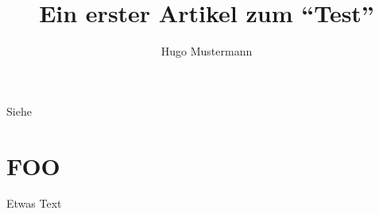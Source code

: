 \documentclass{dtk2}
\author{Hugo Mustermann}
\begin{document}
\title{Ein erster Artikel zum "`Test"'}

\maketitle
\nocite{*}
Siehe~\cite{knuth:ct:a}

\section{FOO}

Etwas Text \clearpage

\printbibliography
\end{document}
